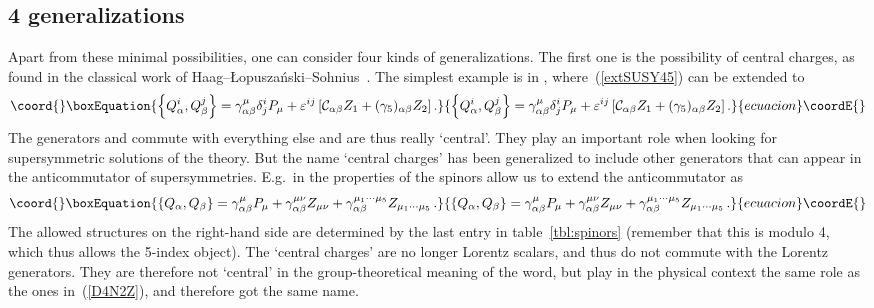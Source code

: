 \documentclass[a4paper,11pt,twoside]{article}
\providecommand{\Red}[1]{#1}
\providecommand{\OliveGreen}[1]{#1}
\providecommand{\Blue}[1]{#1}
\begin{document}
\subsection{4 generalizations}
Apart from these minimal possibilities, one can consider four kinds of
generalizations. The first one is the possibility of central charges, as
found in the classical work of
Haag--{\L}opusza\'nski--Sohnius~\cite{Haag:1975qh}. The simplest example
is in \coordHE{}, where~(\ref{extSUSY45}) can be extended to
\begin{equation}\coord{}\boxEquation{
  \left\{ \Blue{Q}^i_\alpha ,\Blue{Q}^j_\beta \right\} =
  \gamma ^\mu
_{\alpha \beta }\delta ^i_j\OliveGreen{P_\mu
  }+\varepsilon ^{ij}\left[ {\cal C}_{\alpha \beta }\Red{Z_1}+
  (\gamma _5)_{\alpha \beta }\Red{Z_2}\right].
 \label{D4N2Z}
}{
  \left\{ \Blue{Q}^i_\alpha ,\Blue{Q}^j_\beta \right\} =
  \gamma ^\mu
_{\alpha \beta }\delta ^i_j\OliveGreen{P_\mu
  }+\varepsilon ^{ij}\left[ {\cal C}_{\alpha \beta }\Red{Z_1}+
  (\gamma _5)_{\alpha \beta }\Red{Z_2}\right].
 }{ecuacion}\coordE{}\end{equation}
The generators \coordHE{} and \coordHE{} commute with everything else and are thus
really `central'. They play an important role when looking for
supersymmetric solutions of the theory. But the name `central charges'
has been generalized to include other generators that can appear in the
anticommutator of supersymmetries. E.g.\ in \coordHE{} the properties of the
spinors allow us to extend the anticommutator as~\cite{vanHolten:1982mx}
\begin{equation}\coord{}\boxEquation{
  \left\{\Blue{Q}_\alpha ,\Blue{Q}_\beta  \right\}=\gamma^\mu _{\alpha \beta } \OliveGreen{P}_\mu
+\gamma ^{\mu \nu } _{\alpha \beta }\Red{Z}_{\mu \nu }+\gamma
^{\mu_1\cdots \mu_5 } _{\alpha \beta }\Red{Z}_{\mu_1\cdots \mu_5 }\,.
 \label{QQD11}
}{
  \left\{\Blue{Q}_\alpha ,\Blue{Q}_\beta  \right\}=\gamma^\mu _{\alpha \beta } \OliveGreen{P}_\mu
+\gamma ^{\mu \nu } _{\alpha \beta }\Red{Z}_{\mu \nu }+\gamma
^{\mu_1\cdots \mu_5 } _{\alpha \beta }\Red{Z}_{\mu_1\cdots \mu_5 }\,.
 }{ecuacion}\coordE{}\end{equation}
The allowed structures on the right-hand side are determined by the last
entry in table~\ref{tbl:spinors} (remember that this is modulo 4, which
thus allows the 5-index object). The `central charges' \myHighlight{$\Red{Z}$}\coordHE{} are no
longer Lorentz scalars, and thus do not commute with the Lorentz
generators. They are therefore not `central' in the group-theoretical
meaning of the word, but play in the physical context the same role as
the ones in~(\ref{D4N2Z}), and therefore got the same name.
\end{document}
